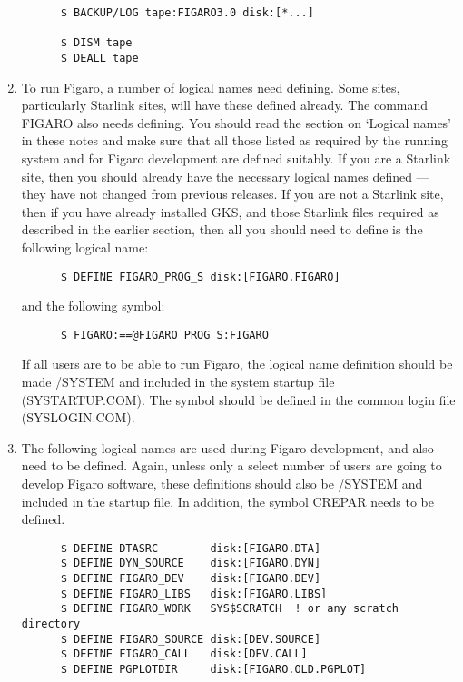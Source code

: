 \begin{enumerate}
\begin{verbatim}
      $ BACKUP/LOG tape:FIGARO3.0 disk:[*...]

      $ DISM tape
      $ DEALL tape
\end{verbatim}

\item To run Figaro, a number of logical names need defining.  Some sites,
particularly  Starlink sites, will have these defined already.  The command
FIGARO also needs defining.  You should read  the  section on `Logical names'
in these notes and make sure that all those listed as required by the running
system and  for Figaro development are defined suitably.  If you are a Starlink
site, then you should already have  the  necessary logical  names  defined ---
they have not changed from previous releases.  If you are not a Starlink site,
then if  you  have already  installed  GKS, and those Starlink files required
as described in the earlier section, then all you should need to define is the
following logical name:

\begin{verbatim}
      $ DEFINE FIGARO_PROG_S disk:[FIGARO.FIGARO]
\end{verbatim}

and the following symbol:

\begin{verbatim}
      $ FIGARO:==@FIGARO_PROG_S:FIGARO
\end{verbatim}

If all users are to be able to run Figaro, the  logical  name definition
should be made /SYSTEM and included in the system startup file (SYSTARTUP.COM).
The symbol should  be  defined in the common login file (SYSLOGIN.COM).

\item The  following  logical  names are used during Figaro
development, and also need to be defined.  Again, unless only a  select  number
of  users  are  going  to  develop  Figaro software,  these  definitions
should  also  be  /SYSTEM  and included in the startup file.  In addition, the
symbol CREPAR needs to be defined.

\begin{verbatim}
      $ DEFINE DTASRC        disk:[FIGARO.DTA]
      $ DEFINE DYN_SOURCE    disk:[FIGARO.DYN]
      $ DEFINE FIGARO_DEV    disk:[FIGARO.DEV]
      $ DEFINE FIGARO_LIBS   disk:[FIGARO.LIBS]
      $ DEFINE FIGARO_WORK   SYS$SCRATCH  ! or any scratch directory
      $ DEFINE FIGARO_SOURCE disk:[DEV.SOURCE]
      $ DEFINE FIGARO_CALL   disk:[DEV.CALL]
      $ DEFINE PGPLOTDIR     disk:[FIGARO.OLD.PGPLOT]


\end{verbatim}
\end{enumerate}
